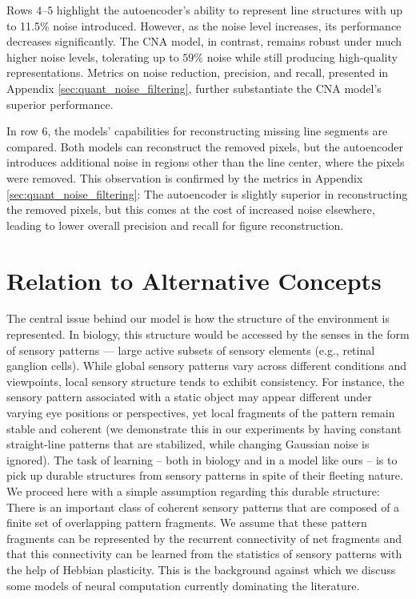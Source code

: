 \documentclass[12pt]{article}
\begin{document}
Rows $4$--$5$ highlight the autoencoder's ability to represent line structures with up to 11.5\% noise introduced. However, as the noise level increases, its performance decreases significantly. The CNA model, in contrast, remains robust under much higher noise levels, tolerating up to $59\%$ noise while still producing high-quality representations. Metrics on noise reduction, precision, and recall, presented in Appendix \ref{sec:quant_noise_filtering}, further substantiate the CNA model's superior performance.

In row $6$, the models' capabilities for reconstructing missing line segments are compared. Both models can reconstruct the removed pixels, but the autoencoder introduces additional noise in regions other than the line center, where the pixels were removed.
This observation is confirmed by the metrics in Appendix \ref{sec:quant_noise_filtering}: The autoencoder is slightly superior in reconstructing the removed pixels, but this comes at the cost of increased noise elsewhere, leading to lower overall precision and recall for figure reconstruction.


\section{Relation to Alternative Concepts} \label{sec:RelatedWork} 
The central issue behind our model is how the structure of the environment is represented. In biology, this structure would be accessed by the senses in the form of sensory patterns --- large active subsets of sensory elements (e.g., retinal ganglion cells). While global sensory patterns vary across different conditions and viewpoints, local sensory structure tends to exhibit consistency. For instance, the sensory pattern associated with a static object may appear different under varying eye positions or perspectives, yet local fragments of the pattern remain stable and coherent (we demonstrate this in our experiments by having constant straight-line patterns that are stabilized, while changing Gaussian noise is ignored).
The task of learning -- both in biology and in a model like ours -- is to pick up durable structures from sensory patterns in spite of their fleeting nature. We proceed here with a simple assumption regarding this durable structure: There is an important class of coherent sensory patterns that are composed of a finite set of overlapping pattern fragments. We assume that these pattern fragments can be represented by the recurrent connectivity of net fragments and that this connectivity can be learned from the statistics of sensory patterns with the help of Hebbian plasticity.  This is the background against which we discuss some models of neural computation currently dominating the literature.
\end{document}
